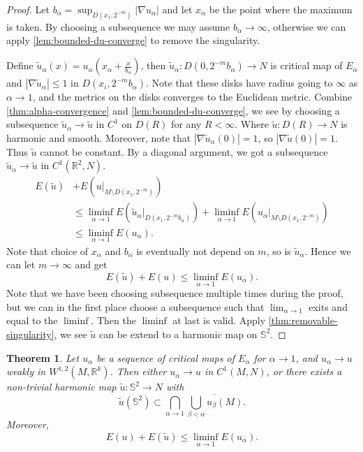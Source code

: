\documentclass[UTF8,12pt]{article}
\theoremstyle{plain}\newtheorem{theorem}{Theorem}
\theoremstyle{definition}\newtheorem{definition}[theorem]{Definition}
\theoremstyle{definition}\newtheorem{example}[theorem]{Example}
\theoremstyle{plain}\newtheorem{axiom}[theorem]{Axiom}
\theoremstyle{plain}\newtheorem{assertion}[theorem]{Assertion}
\theoremstyle{plain}\newtheorem{corollary}[theorem]{Corollary}
\theoremstyle{plain}\newtheorem{lemma}[theorem]{Lemma}
\theoremstyle{plain}\newtheorem{proposition}[theorem]{Proposition}
\theoremstyle{plain}\newtheorem{prop}[theorem]{Proposition}
\theoremstyle{plain}\newtheorem{conjecture}[theorem]{Conjecture}
\theoremstyle{plain}\newtheorem{conj}[theorem]{Conjecture}
\theoremstyle{plain}\newtheorem{problem}[theorem]{Problem}
\theoremstyle{remark}\newtheorem{notation}[theorem]{Notation}
\theoremstyle{definition}\newtheorem*{question}{Question}
\theoremstyle{definition}\newtheorem*{answer}{Answer}
\theoremstyle{definition}\newtheorem*{goal}{Goal}
\theoremstyle{plain}\newtheorem*{application}{Application}
\theoremstyle{plain}\newtheorem*{exercise}{Exercise}
\theoremstyle{remark}\newtheorem*{remark}{Remark}
\theoremstyle{remark}\newtheorem*{note}{\small{Note}}
\numberwithin{equation}{section}
\numberwithin{theorem}{section}
\numberwithin{figure}{section}
\begin{document}
\begin{proof}
    Let \(b_\alpha=\sup_{D(x_1,2^{-m})}|\nabla u_\alpha|\) and let \(x_\alpha\) be
    the point where the maximum is taken. By choosing a subsequence we may assume
    \(b_\alpha\to \infty\), otherwise we can apply \cref{lem:bounded-du-converge}
    to remove the singularity.

    Define \(\tilde{u}_\alpha(x)=u_\alpha(x_\alpha+\frac{x}{b_\alpha})\), then 
    \(\tilde{u}_\alpha\colon D(0,2^{-m}b_\alpha)\to N\) is critical map of
    \(E_\alpha\) and \(|\nabla\tilde{u}_\alpha|\le 1\) in \(D(x_i,2^{-m}b_\alpha)\).
    Note that these disks have radius going to \(\infty\) as \(\alpha\to 1\), and
    the metrics on the disks converges to the Euclidean metric.
    Combine \cref{thm:alpha-convergence} and \cref{lem:bounded-du-converge}, we see 
    by choosing a subsequence \(\tilde{u}_\alpha\to \tilde{u}\) in \(C^1\) on
    \(D(R)\) for any \(R<\infty\). Where \(\tilde{u}\colon D(R)\to N\) is 
    harmonic and smooth. Moreover, note that \(|\nabla \tilde{u}_\alpha(0)|=1\), so
    \(|\nabla\tilde{u}(0)|=1\). Thus \(\tilde{u}\) cannot be constant. By a diagonal
    argument, we got a subsequence \(\tilde{u}_\alpha\to \tilde{u}\) in \(C^1(
    \mathbb{R}^2,N)\).
    \begin{align*}
        E(\tilde{u})&+E\left(u\big|_{M\setminus D(x_1,2^{-m})}\right) \\
        &\le\liminf_{\alpha\to 1}
        E\left(\tilde{u}_\alpha\big|_{D(x_1,2^{-m}b_\alpha)}\right)
        +\liminf_{\alpha\to 1}E\left(u_\alpha\big|_{M\setminus D(x_1,2^{-m})}\right)\\
        &\le \liminf_{\alpha\to 1}E(u_\alpha)
    .\end{align*}
    Note that choice of \(x_\alpha\) and \(b_\alpha\) is eventually not depend on
    \(m\), so is \(\tilde{u}_\alpha\). Hence we can let \(m\to \infty\) and get \[
        E(\tilde{u})+E(u)\le \liminf_{\alpha\to 1}E(u_\alpha)
    .\] Note that we have been choosing subsequence multiple times during the proof,
    but we can in the first place choose a subsequence such that \(\lim_{\alpha\to 1}
    \) exits and equal to the \(\liminf\). Then the \(\liminf\) at last is valid.
    Apply \cref{thm:removable-singularity}, we see \(\tilde{u}\) can be extend
    to a harmonic map on \(\mathbb{S}^2\).
\end{proof}

\begin{theorem}\label{thm:main-converge}
    Let \(u_\alpha\) be a sequence of critical maps of \(E_\alpha\) for
    \(\alpha\to 1\), and \(u_\alpha\to u\) weakly in \(W^{1,2}(M,\mathbb{R}^k)\).
    Then either \(u_\alpha\to u\) in \(C^1(M,N)\), or there exists a non-trivial
    harmonic map \(\tilde{u}:\mathbb{S}^2\to N\) with \[
        \tilde{u}(\mathbb{S}^2)\subset \bigcap_{\alpha\to 1}
        \overline{\bigcup_{\beta<\alpha}u_\beta(M)}
    .\]
    Moreover, \[
        E(u)+E(\tilde{u})\le \liminf_{\alpha\to 1}E(u_\alpha)
    .\] 
\end{theorem}
\end{document}
